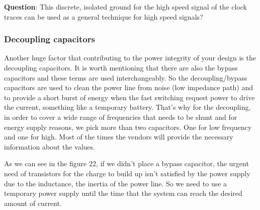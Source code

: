 \documentclass[final]{cubedoc}
\begin{document}
	\textbf{Question}: This discrete, isolated ground for the high speed signal of the clock traces can be used as a general technique for high speed signals?
	
	\subsubsection{Decoupling capacitors}
	
	Another huge factor that contributing to the power integrity of your design is the decoupling capacitors. It is worth mentioning that there are also the bypass capacitors and these terms are used interchangeably. So the decoupling/bypass capacitors are used to clean the power line from noise (low impedance path) and to provide a short burst of energy when the fast switching request power to drive the current, something like a temporary battery. That's why for the decoupling, in order to cover a wide range of frequencies that needs to be shunt and for energy supply reasons, we pick more than two capacitors. One for low frequency and one for high. Most of the times the vendors will provide the necessary information about the values.
	
	As we can see in the figure 22, if we didn't place a bypass capacitor, the urgent need of transistors for the charge to build up isn't satisfied by the power supply due to the inductance, the inertia of the power line. So we need to use a temporary power supply until the time that the system can reach the desired amount of current. 
	
\end{document}
